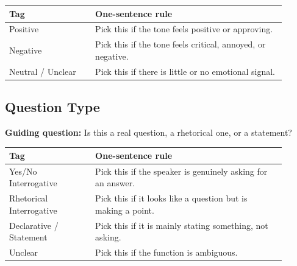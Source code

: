 \documentclass[11pt]{article}
\begin{document}
\begin{table}[H]
\centering
\small
\begin{tabular}{p{0.28\linewidth}p{0.62\linewidth}}
\toprule
\textbf{Tag} & \textbf{One-sentence rule} \\
\midrule
Positive & Pick this if the tone feels positive or approving. \\
Negative & Pick this if the tone feels critical, annoyed, or negative. \\
Neutral / Unclear & Pick this if there is little or no emotional signal. \\
\bottomrule
\end{tabular}
\end{table}
\vspace{-0.75em}

\subsection{Question Type}

\noindent\textbf{Guiding question:} Is this a real question, a rhetorical one, or a statement?

\begin{table}[H]
\centering
\small
\begin{tabular}{p{0.28\linewidth}p{0.62\linewidth}}
\toprule
\textbf{Tag} & \textbf{One-sentence rule} \\
\midrule
Yes/No Interrogative & Pick this if the speaker is genuinely asking for an answer. \\
Rhetorical Interrogative & Pick this if it looks like a question but is making a point. \\
Declarative / Statement & Pick this if it is mainly stating something, not asking. \\
Unclear & Pick this if the function is ambiguous. \\
\bottomrule
\end{tabular}
\end{table}
\vspace{-0.75em}
\end{document}
